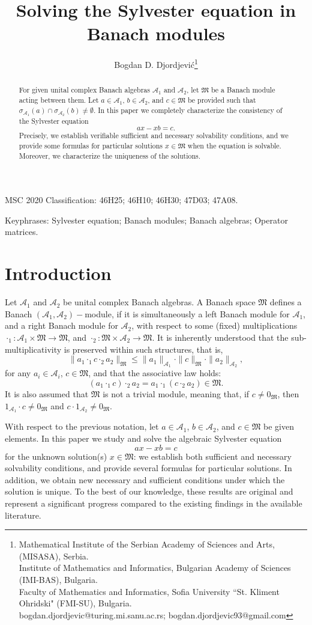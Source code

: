 \documentclass{article}
\author{Bogdan D. Djordjevi\'c\footnote{Mathematical Institute of the Serbian Academy of Sciences and Arts, (MISASA), Serbia. \\
Institute of
Mathematics and Informatics, Bulgarian Academy of Sciences (IMI-BAS), Bulgaria.\\
Faculty of Mathematics and Informatics, Sofia University ``St. Kliment Ohridski" (FMI-SU), Bulgaria.\\
bogdan.djordjevic@turing.mi.sanu.ac.rs; bogdan.djordjevic93@gmail.com
}}
\date{}
\theoremstyle{definition}
\def\A{{\mathcal{A}}}
\def\M{\mathfrak{M}}
\begin{document}
\title{Solving the Sylvester equation in Banach modules}

\maketitle

\begin{abstract} 
For given unital complex Banach algebras $\A_1$ and $\A_2$, let $\M$ be a Banach module acting between them. Let $a\in\A_1$, $b\in\A_2$, and $c\in\M$ be provided such that $\sigma_{\A_1}(a)\cap\sigma_{\A_2}(b)\neq\emptyset$. In this paper we completely characterize the consistency of the Sylvester equation $$ax-xb=c.$$
Precisely, we establish verifiable sufficient and necessary solvability conditions, and we provide some formulas for particular solutions $x\in\M$ when the equation is solvable.  Moreover, we characterize the uniqueness of the solutions. \end{abstract}

{ MSC 2020 Classification: 46H25; 46H10; 46H30; 47D03; 47A08.}

{ Keyphrases: Sylvester equation; Banach modules; Banach algebras; Operator matrices.}







\section{Introduction}
Let $\A_1$ and $\A_2$ be unital complex Banach algebras. A Banach space $\M$ defines a Banach $(\A_1,\A_2)-$module, if  it is simultaneously a left Banach module for $\A_1$, and a right Banach module for $\A_2$, with respect to some (fixed) multiplications $\cdot_1:\A_1\times\M\to\M$, and $\cdot_2:\M\times\A_2\to\M$. It is inherently understood that the sub-multiplicativity is preserved within such structures, that is,
$$\|a_1\cdot_{1} c\cdot_{2} a_2\|_{\M}\leq \|a_1\|_{\A_1}\cdot\|c\|_\M\cdot\|a_2\|_{\A_2},$$
for any $a_i\in\A_i$, $c\in\M$, and that the associative law holds:
$$\left(a_1\cdot_1 c\right)\cdot_2 a_2=a_1\cdot_1 \left(c\cdot_2 a_2\right)\in\M.$$
It is also assumed that $\M$ is not a trivial module, meaning that, if $c\neq 0_\M$, then $1_{\A_1}\cdot c\neq 0_\M$ and $c\cdot 1_{\A_2}\neq 0_\M$.

With respect to the previous notation, let $a\in\A_1$, $b\in\A_2$, and $c\in\M$ be given elements. In this paper we study and solve the algebraic Sylvester equation  
\begin{equation}
\label{sylm-}
ax-xb=c
\end{equation}
for the unknown solution(s) $x\in\M$: we establish both sufficient and necessary solvability conditions, and provide several formulas for particular solutions. In addition, we obtain new necessary and sufficient conditions under which the solution is unique. To the best of our knowledge, these results are original and represent a significant progress compared to the existing findings in the available literature.
\end{document}
